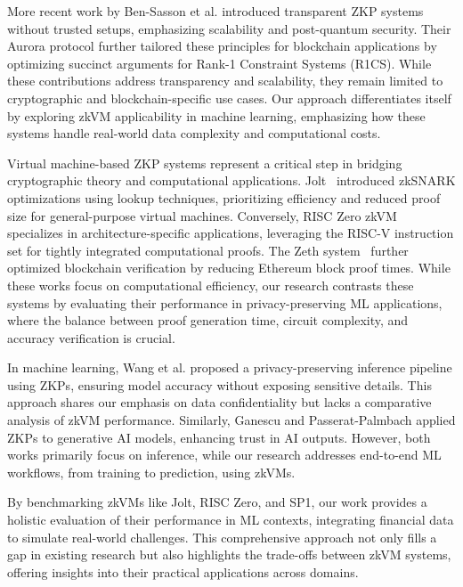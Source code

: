 \documentclass{scrartcl}
\begin{document}
More recent work by Ben-Sasson et al.\cite{BenSasson2018} introduced transparent ZKP systems without trusted setups, emphasizing scalability and post-quantum security. Their Aurora protocol\cite{Aurora2019} further tailored these principles for blockchain applications by optimizing succinct arguments for Rank-1 Constraint Systems (R1CS). While these contributions address transparency and scalability, they remain limited to cryptographic and blockchain-specific use cases. Our approach differentiates itself by exploring zkVM applicability in machine learning, emphasizing how these systems handle real-world data complexity and computational costs.

Virtual machine-based ZKP systems represent a critical step in bridging cryptographic theory and computational applications. Jolt~\cite{Arun2024} introduced zkSNARK optimizations using lookup techniques, prioritizing efficiency and reduced proof size for general-purpose virtual machines. Conversely, RISC Zero zkVM~\cite{Bruestle2023} specializes in architecture-specific applications, leveraging the RISC-V instruction set for tightly integrated computational proofs. The Zeth system~\cite{RISCZeth2023} further optimized blockchain verification by reducing Ethereum block proof times. While these works focus on computational efficiency, our research contrasts these systems by evaluating their performance in privacy-preserving ML applications, where the balance between proof generation time, circuit complexity, and accuracy verification is crucial.

In machine learning, Wang et al.\cite{Wang2024} proposed a privacy-preserving inference pipeline using ZKPs, ensuring model accuracy without exposing sensitive details. This approach shares our emphasis on data confidentiality but lacks a comparative analysis of zkVM performance. Similarly, Ganescu and Passerat-Palmbach\cite{Ganescu2024} applied ZKPs to generative AI models, enhancing trust in AI outputs. However, both works primarily focus on inference, while our research addresses end-to-end ML workflows, from training to prediction, using zkVMs.

By benchmarking zkVMs like Jolt, RISC Zero, and SP1, our work provides a holistic evaluation of their performance in ML contexts, integrating financial data to simulate real-world challenges. This comprehensive approach not only fills a gap in existing research but also highlights the trade-offs between zkVM systems, offering insights into their practical applications across domains.
\end{document}
